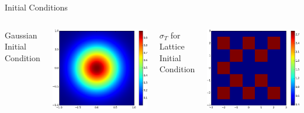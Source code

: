 \documentclass{beamer}
\begin{document}
    \begin{frame}{Initial Conditions}
        \begin{columns}
            \centering
            Gaussian Initial Condition

            \includegraphics[width=\textwidth]{initcond_gaussian.png}

            \centering
            $\sigma_T$ for Lattice Initial Condition

            \includegraphics[width=\textwidth]{initcond_lattice-t.png}


\end{columns}
\end{frame}
\end{document}
